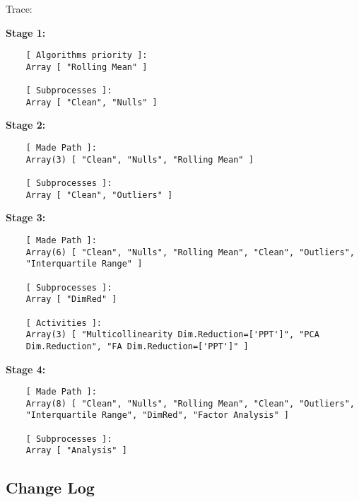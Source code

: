 \documentclass[a4paper]{article}
\begin{document}
\medskip
Trace:

\medskip
\textbf{Stage 1:}
\begin{verbatim}
    [ Algorithms priority ]:
    Array [ "Rolling Mean" ]

    [ Subprocesses ]:
    Array [ "Clean", "Nulls" ]
\end{verbatim}

\textbf{Stage 2:}
\begin{verbatim}
    [ Made Path ]:
    Array(3) [ "Clean", "Nulls", "Rolling Mean" ]
    
    [ Subprocesses ]:
    Array [ "Clean", "Outliers" ]
\end{verbatim}

\textbf{Stage 3:}
\begin{verbatim}
    [ Made Path ]:
    Array(6) [ "Clean", "Nulls", "Rolling Mean", "Clean", "Outliers",
    "Interquartile Range" ]
    
    [ Subprocesses ]:
    Array [ "DimRed" ]
    
    [ Activities ]:
    Array(3) [ "Multicollinearity Dim.Reduction=['PPT']", "PCA
    Dim.Reduction", "FA Dim.Reduction=['PPT']" ]
\end{verbatim}

\textbf{Stage 4:}
\begin{verbatim}
    [ Made Path ]:
    Array(8) [ "Clean", "Nulls", "Rolling Mean", "Clean", "Outliers",
    "Interquartile Range", "DimRed", "Factor Analysis" ]
    
    [ Subprocesses ]:
    Array [ "Analysis" ]
\end{verbatim}


\subsection{Change Log}
\label{sec:orgeff8805}
\end{document}
